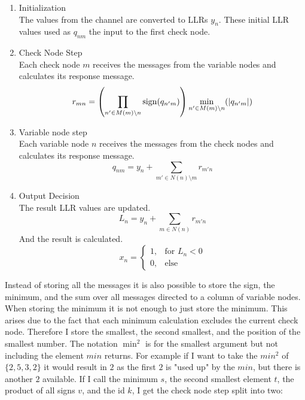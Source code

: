 \begin{enumerate}
\item{Initialization}\\
The values from the channel are converted to LLRs $y_n$. These initial LLR values used as $q_{nm}$ the input to the first check node.

\item{Check Node Step}\\
Each check node $m$ receives the messages from the variable nodes and calculates its response message.
\begin{equation}
    r_{mn} = \left( \prod_{n' \in M(m)\setminus n}\operatorname{sign}(q_{n'm}) \right) \min_{n' \in M(m) \setminus n}(\left|q_{n'm}\right|)
\end{equation}

\item{Variable node step}\\
Each variable node $n$ receives the messages from the check nodes and calculates its response message.
\begin{equation}
    q_{nm} = y_n + \sum_{m' \in N(n)\setminus m}r_{m'n}
\end{equation}

\item{Output Decision}\\
The result LLR values are updated.
\begin{equation}
    L_n = y_n + \sum_{m \in N(n)}r_{m'n}
\end{equation}
And the result is calculated.
\begin{equation}
    x_n = \begin{cases}
        1, & \text{for } L_n < 0 \\
        0, & \text{else}
    \end{cases}
\end{equation}

\end{enumerate}

Instead of storing all the messages it is also possible to store the sign, the minimum, and the sum over all messages directed to a column of variable nodes. When storing the minimum it is not enough to just store the minimum. This arises due to the fact that each minimum calculation excludes the current check node. Therefore I store the smallest, the second smallest, and the position of the smallest number. The notation $\min^2$ is for the smallest argument but not including the element $min$ returns. For example if I want to take the $min^2$ of $\{2, 5, 3, 2\}$ it would result in $2$ as the first $2$ is "used up" by the $min$, but there is another $2$ available. If I call the minimum $s$, the second smallest element $t$, the product of all signs $v$, and the id $k$, I get the check node step split into two:


